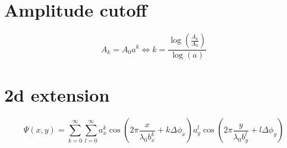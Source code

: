 \documentclass[a4paper, 12pt]{scrartcl}
\begin{document}
\section{Amplitude cutoff}
\[
 	A_k = A_0 a^k\Leftrightarrow k = \frac{\log\left(\frac{A_k}{A_0}\right)}{\log(a)}
\]


\section{2d extension}

\[
 \Psi(x, y) = \sum_{k=0}^\infty \sum_{l=0}^\infty a_x^k\cos\left(2\pi \frac{x}{\lambda_0 b_x^k} + k\Delta \phi_x\right)a_y^l\cos\left(2\pi \frac{y}{\lambda_0 b_y^l} + l\Delta \phi_y\right)
\]
\end{document}
